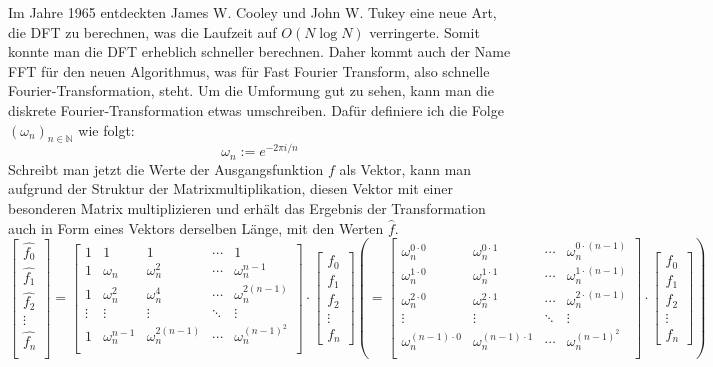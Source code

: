 \documentclass[a4paper,12pt]{article}
\theoremstyle{definition}
\theoremstyle{remark}
\begin{document}
Im Jahre 1965 entdeckten James W. Cooley und John W. Tukey eine neue Art, die DFT zu berechnen, was die Laufzeit auf $O(N\log N)$ verringerte. 
Somit konnte man die DFT erheblich schneller berechnen. Daher kommt auch der Name FFT für den neuen Algorithmus, was für Fast Fourier 
Transform, also schnelle Fourier-Transformation, steht. Um die Umformung gut zu sehen, kann man die 
diskrete Fourier-Transformation etwas umschreiben. Dafür definiere ich die Folge $(\omega_n)_{n\in\mathbb{N}}$ 
wie folgt:
$$\omega_n := e^{-2\pi i /n}$$
Schreibt man jetzt die Werte der Ausgangsfunktion $f$ als Vektor, kann man aufgrund der Struktur 
der Matrixmultiplikation, diesen Vektor mit einer besonderen Matrix multiplizieren und erhält das 
Ergebnis der Transformation auch in Form eines Vektors derselben Länge, mit den Werten $\hat{f}$. 
\[
\begin{bmatrix}
  \hat{f_0}\\
\hat{f_1}\\
\hat{f_2}\\
\vdots \\
\hat{f_n}\\
\end{bmatrix}
=
\begin{bmatrix}
  1 & 1 & 1 & \cdots & 1\\
  1 & \omega_n & \omega_n^2 & \cdots & \omega_n^{n-1} \\
  1 & \omega_n^2 & \omega_n^4 & \cdots & \omega_n^{2(n-1)}\\
  \vdots & \vdots & \vdots & \ddots & \vdots \\
  1 & \omega_n^{n-1} & \omega_n^{2(n-1)} & \cdots & \omega_n^{(n-1)^2}\\
\end{bmatrix}
\cdot
\begin{bmatrix}
  f_0\\
  f_1\\
  f_2\\
  \vdots\\
  f_n
\end{bmatrix}
\left(
  = 
\begin{bmatrix}
  \omega_n^{0 \cdot 0} & \omega_n^{0 \cdot 1} & \cdots & \omega_n^{0 \cdot (n-1)}\\
  \omega_n^{1 \cdot 0} & \omega_n^{1 \cdot 1} &  \cdots & \omega_n^{1 \cdot (n-1)} \\
  \omega_n^{2 \cdot 0} & \omega_n^{2 \cdot 1} &  \cdots & \omega_n^{2 \cdot (n-1)}\\
  \vdots & \vdots & \ddots & \vdots \\
  \omega_n^{(n-1) \cdot 0} & \omega_n^{(n-1) \cdot 1} & \cdots & \omega_n^{(n-1)^2}\\
\end{bmatrix}
\cdot
\begin{bmatrix}
  f_0\\
  f_1\\
  f_2\\
  \vdots\\
  f_n
\end{bmatrix}
\right)
\]
\end{document}
